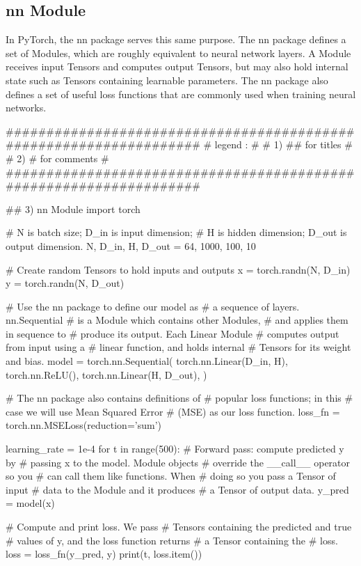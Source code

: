 \documentclass[11pt]{article}
\begin{document}
\subsection{nn Module}
In PyTorch, the nn package serves this same purpose. The nn package defines a set of Modules, which are roughly equivalent to neural network layers. A Module receives input Tensors and computes output Tensors, but may also hold internal state such as Tensors containing learnable parameters. The nn package also defines a set of useful loss functions that are commonly used when training neural networks.
\begin{python}
###################################################################
# legend :                                                        #
#         1) ## for titles                                        #
#         2) #  for comments                                      #
###################################################################   

## 3) nn Module
import torch

# N is batch size; D_in is input dimension;
# H is hidden dimension; D_out is output dimension.
N, D_in, H, D_out = 64, 1000, 100, 10

# Create random Tensors to hold inputs and outputs
x = torch.randn(N, D_in)
y = torch.randn(N, D_out)

# Use the nn package to define our model as 
# a sequence of layers. nn.Sequential
# is a Module which contains other Modules, 
# and applies them in sequence to
# produce its output. Each Linear Module 
# computes output from input using a
# linear function, and holds internal 
# Tensors for its weight and bias.
model = torch.nn.Sequential(
    torch.nn.Linear(D_in, H),
    torch.nn.ReLU(),
    torch.nn.Linear(H, D_out),
)

# The nn package also contains definitions of 
# popular loss functions; in this
# case we will use Mean Squared Error 
# (MSE) as our loss function.
loss_fn = torch.nn.MSELoss(reduction='sum')

learning_rate = 1e-4
for t in range(500):
    # Forward pass: compute predicted y by 
    # passing x to the model. Module objects
    # override the __call__ operator so you 
    # can call them like functions. When
    # doing so you pass a Tensor of input 
    # data to the Module and it produces
    # a Tensor of output data.
    y_pred = model(x)

    # Compute and print loss. We pass 
    # Tensors containing the predicted and true
    # values of y, and the loss function returns 
    # a Tensor containing the
    # loss.
    loss = loss_fn(y_pred, y)
    print(t, loss.item())


\end{python}
\end{document}
